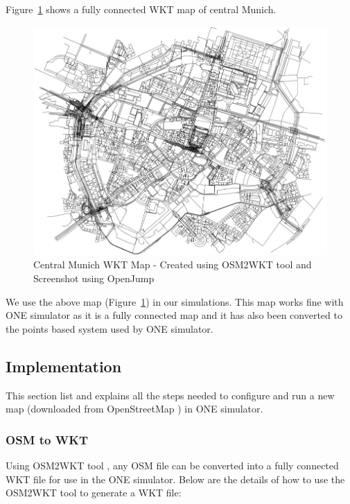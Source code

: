 	\newpage
	Figure~\ref{fig:central-munich-wkt} shows a fully connected WKT map of central Munich.
	\vspace{6mm}
	\begin{figure}[H]
		\centering
		\includegraphics[scale=0.5]{./figures/central-munich-wkt}
		\caption{Central Munich WKT Map - Created using OSM2WKT tool \cite{mayer2010osm} and Screenshot using OpenJump \cite{openjump}}
		\label{fig:central-munich-wkt}
	\end{figure}
	\vspace{3mm}
We use the above map (Figure~\ref{fig:central-munich-wkt}) in our simulations. This map works fine with ONE simulator as it is a fully connected map and it has also been converted to the points based system used by ONE simulator.
\newpage
\subsection{Implementation}
This section list and explains all the steps needed to configure and run a new map (downloaded from OpenStreetMap \cite{openstreetmap}) in ONE simulator.
\subsubsection{OSM to WKT}
Using OSM2WKT tool \cite{mayer2010osm}, any OSM file can be converted into a fully connected WKT file for use in the ONE simulator. Below are the details of how to use the OSM2WKT tool \cite{mayer2010osm} to generate a WKT file:\newline

